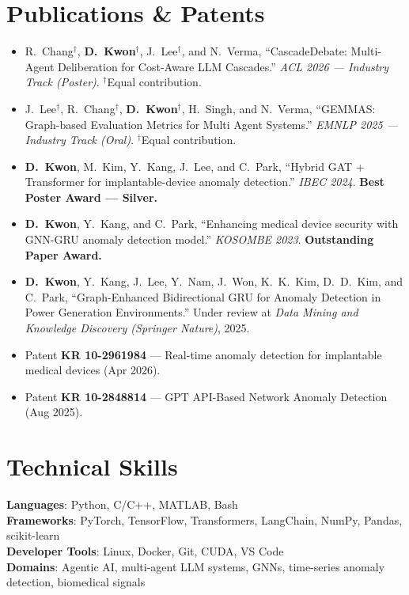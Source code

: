 \documentclass[letterpaper,11pt]{article}
\newcommand{\resumeSubHeadingListStart}{\begin{itemize}[leftmargin=0.15in, label={}]}
\newcommand{\resumeSubHeadingListEnd}{\end{itemize}}
\begin{document}
\section{Publications \& Patents}
  \resumeSubHeadingListStart
    \item\small{
      R.~Chang$^{\dagger}$, \textbf{D.~Kwon}$^{\dagger}$, J.~Lee$^{\dagger}$, and N.~Verma, ``CascadeDebate: Multi-Agent Deliberation for Cost-Aware LLM Cascades.'' \textit{ACL 2026 --- Industry Track (Poster)}. $^{\dagger}$Equal contribution.    }
    \item\small{
      J.~Lee$^{\dagger}$, R.~Chang$^{\dagger}$, \textbf{D.~Kwon}$^{\dagger}$, H.~Singh, and N.~Verma, ``GEMMAS: Graph-based Evaluation Metrics for Multi Agent Systems.'' \textit{EMNLP 2025 --- Industry Track (Oral)}. $^{\dagger}$Equal contribution.    }
    \item\small{
      \textbf{D.~Kwon}, M.~Kim, Y.~Kang, J.~Lee, and C.~Park, ``Hybrid GAT + Transformer for implantable-device anomaly detection.'' \textit{IBEC 2024}. \textbf{Best Poster Award --- Silver.}    }
    \item\small{
      \textbf{D.~Kwon}, Y.~Kang, and C.~Park, ``Enhancing medical device security with GNN-GRU anomaly detection model.'' \textit{KOSOMBE 2023}. \textbf{Outstanding Paper Award.}    }
    \item\small{
      \textbf{D.~Kwon}, Y.~Kang, J.~Lee, Y.~Nam, J.~Won, K.~K.~Kim, D.~D.~Kim, and C.~Park, ``Graph-Enhanced Bidirectional GRU for Anomaly Detection in Power Generation Environments.'' Under review at \textit{Data Mining and Knowledge Discovery (Springer Nature)}, 2025.
    }
    \item\small{
      Patent \textbf{KR 10-2961984} --- Real-time anomaly detection for implantable medical devices (Apr 2026).
    }
    \item\small{
      Patent \textbf{KR 10-2848814} --- GPT API-Based Network Anomaly Detection (Aug 2025).
    }
  \resumeSubHeadingListEnd


\section{Technical Skills}
 \begin{itemize}[leftmargin=0.15in, label={}]
    \small{\item{
     \textbf{Languages}{: Python, C/C++, MATLAB, Bash} \\
     \textbf{Frameworks}{: PyTorch, TensorFlow, Transformers, LangChain, NumPy, Pandas, scikit-learn} \\
     \textbf{Developer Tools}{: Linux, Docker, Git, CUDA, VS Code} \\
     \textbf{Domains}{: Agentic AI, multi-agent LLM systems, GNNs, time-series anomaly detection, biomedical signals}
    }}
 \end{itemize}


\end{document}
